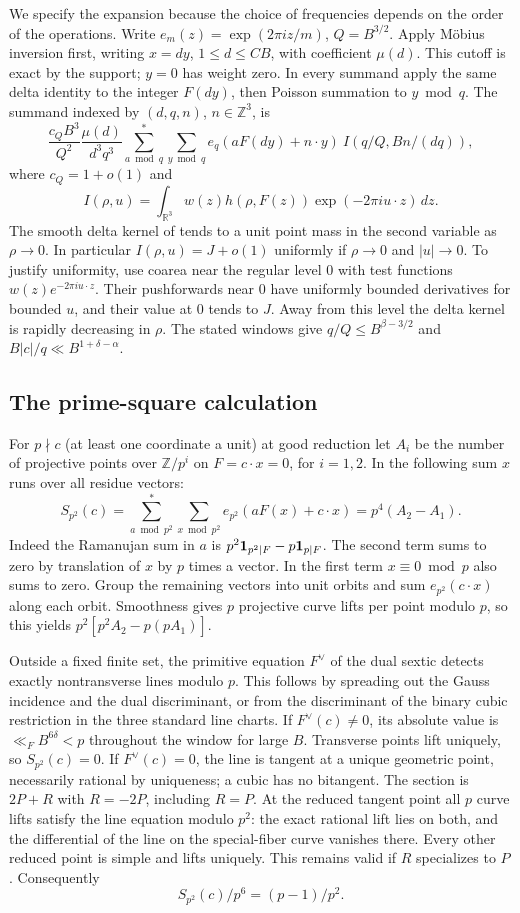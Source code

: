 \documentclass[11pt]{article}
\begin{document}
We specify the expansion because the choice of frequencies depends on the order of the operations. Write $e_m(z)=\exp(2\pi i z/m)$, $Q=B^{3/2}$. Apply M\"obius inversion first, writing $x=dy$, $1\le d\le CB$, with coefficient $\mu(d)$. This cutoff is exact by the support; $y=0$ has weight zero. In every summand apply the same delta identity \cite{HB} to the integer $F(dy)$, then Poisson summation to $y\bmod q$. The summand indexed by $(d,q,n)$, $n\in\mathbb Z^3$, is
\[
 \frac{c_Q B^3}{Q^2}\frac{\mu(d)}{d^3 q^3}
 \sum_{a\bmod q}^{*}\sum_{y\bmod q}e_q(aF(dy)+n\cdot y)
 \ I(q/Q,Bn/(dq)),
\]
where $c_Q=1+o(1)$ and
\[
 I(\rho,u)=\int_{\mathbb R^3}w(z)h(\rho,F(z))\exp(-2\pi i u\cdot z)\,dz .
\]
The smooth delta kernel of \cite{HB} tends to a unit point mass in the second variable as $\rho\to0$. In particular $I(\rho,u)=J+o(1)$ uniformly if $\rho\to0$ and $|u|\to0$. To justify uniformity, use coarea near the regular level $0$ with test functions $w(z)e^{-2\pi i u\cdot z}$. Their pushforwards near $0$ have uniformly bounded derivatives for bounded $u$, and their value at $0$ tends to $J$. Away from this level the delta kernel is rapidly decreasing in $\rho$. The stated windows give $q/Q\le B^{\beta-3/2}$ and $B|c|/q\ll B^{1+\delta-\alpha}$.

\subsection{The prime-square calculation}
For $p\nmid c$ (at least one coordinate a unit) at good reduction let $A_i$ be the number of projective points over $\mathbb Z/p^i$ on $F=c\cdot x=0$, for $i=1,2$. In the following sum $x$ runs over all residue vectors:
\[
 S_{p^2}(c)=\sum_{a\bmod p^2}^{*}\sum_{x\bmod p^2}e_{p^2}(aF(x)+c\cdot x)
           =p^4(A_2-A_1).
\]
Indeed the Ramanujan sum in $a$ is $p^2{\bf1}_{p^2\mid F}-p{\bf1}_{p\mid F}$. The second term sums to zero by translation of $x$ by $p$ times a vector. In the first term $x\equiv0\bmod p$ also sums to zero. Group the remaining vectors into unit orbits and sum $e_{p^2}(c\cdot x)$ along each orbit. Smoothness gives $p$ projective curve lifts per point modulo $p$, so this yields $p^2[p^2A_2-p(pA_1)]$.

Outside a fixed finite set, the primitive equation $F^\vee$ of the dual sextic detects exactly nontransverse lines modulo $p$. This follows by spreading out the Gauss incidence and the dual discriminant, or from the discriminant of the binary cubic restriction in the three standard line charts. If $F^\vee(c)\ne0$, its absolute value is $\ll_F B^{6\delta}<p$ throughout the window for large $B$. Transverse points lift uniquely, so $S_{p^2}(c)=0$. If $F^\vee(c)=0$, the line is tangent at a unique geometric point, necessarily rational by uniqueness; a cubic has no bitangent. The section is $2P+R$ with $R=-2P$, including $R=P$. At the reduced tangent point all $p$ curve lifts satisfy the line equation modulo $p^2$: the exact rational lift lies on both, and the differential of the line on the special-fiber curve vanishes there. Every other reduced point is simple and lifts uniquely. This remains valid if $R$ specializes to $P$. Consequently
\[
 S_{p^2}(c)/p^6=(p-1)/p^2.
\]
\end{document}
